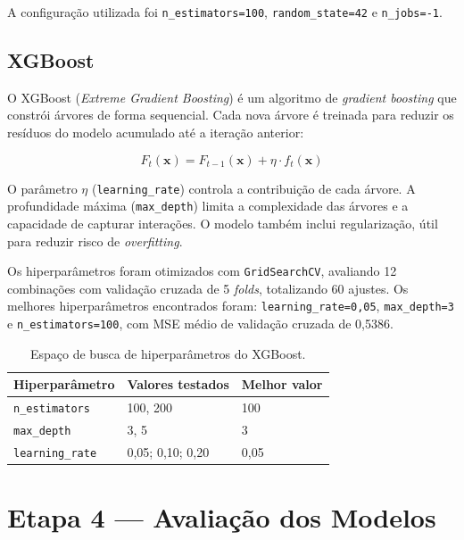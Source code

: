 \documentclass[conference]{IEEEtran}
\newcommand{\fonte}[1][elaborado pelos autores.]{%
\par\vspace{1pt}{\footnotesize\centering Fonte: #1\par}}
\begin{document}
A configuração utilizada foi \texttt{n_estimators=100},
\texttt{random_state=42} e \texttt{n_jobs=-1}.

\subsection{XGBoost}

O XGBoost (\textit{Extreme Gradient Boosting}) \cite{chen2016} é um
algoritmo de \textit{gradient boosting} que constrói árvores de forma
sequencial. Cada nova árvore é treinada para reduzir os resíduos do modelo
acumulado até a iteração anterior:

\begin{equation}
F_t(\mathbf{x}) = F_{t-1}(\mathbf{x}) + \eta \cdot f_t(\mathbf{x})
\end{equation}

O parâmetro $\eta$ (\texttt{learning_rate}) controla a contribuição de cada
árvore. A profundidade máxima (\texttt{max_depth}) limita a complexidade
das árvores e a capacidade de capturar interações. O modelo também inclui
regularização, útil para reduzir risco de \textit{overfitting}.

Os hiperparâmetros foram otimizados com \texttt{GridSearchCV}, avaliando
12 combinações com validação cruzada de 5 \textit{folds}, totalizando
60 ajustes. Os melhores hiperparâmetros encontrados foram:
\texttt{learning_rate=0,05}, \texttt{max_depth=3} e
\texttt{n_estimators=100}, com MSE médio de validação cruzada de 0,5386.

\begin{table}[!t]
\centering
\small
\setlength{\tabcolsep}{4pt}
\caption{Espaço de busca de hiperparâmetros do XGBoost.}
\label{tab:xgb_grid}
\begin{tabular}{lll}
\toprule
\textbf{Hiperparâmetro} & \textbf{Valores testados} & \textbf{Melhor valor} \\
\midrule
\texttt{n_estimators}  & 100, 200                  & 100                   \\
\texttt{max_depth}     & 3, 5                      & 3                     \\
\texttt{learning_rate} & 0,05; 0,10; 0,20          & 0,05                  \\
\bottomrule
\end{tabular}
\fonte
\end{table}

\section{Etapa 4 — Avaliação dos Modelos}
\label{sec:eval}
\end{document}
